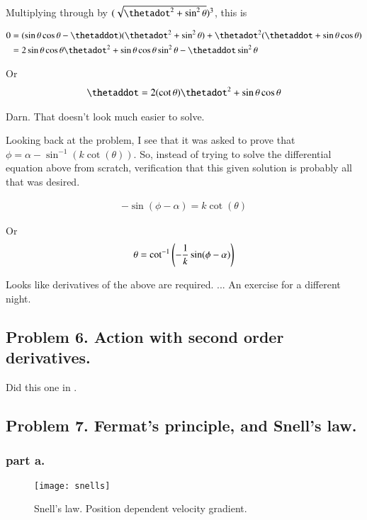 \documentclass{article}
\begin{document}
Multiplying through by $(\sqrt{\thetadot^2 + \sin^2\theta })^3$, this is

\begin{align*}
0 
&= (\sin\theta \cos\theta - \thetaddot) ( \thetadot^2 + \sin^2\theta ) + \thetadot^2( \thetaddot + \sin\theta\cos\theta )  \\
&= 
2 \sin\theta \cos\theta \thetadot^2 
+ \sin\theta \cos\theta \sin^2\theta 
- \thetaddot \sin^2\theta  
\\
\end{align*}

Or
\begin{align*}
\thetaddot =
2 (\cot\theta) \thetadot^2 
+ \sin\theta \cos\theta 
\end{align*}

Darn.  That doesn't look much easier to solve.

Looking back at the problem, I see that it was asked to prove that $\phi = \alpha - \sin^{-1}(k\cot(\theta))$.  So, instead of trying to solve
the differential equation above from scratch, verification that this given solution is probably all that was desired.

\begin{align*}
-\sin(\phi - \alpha) = k\cot(\theta)
\end{align*}

Or
\begin{align*}
\theta = \cot^{-1}\left(-\frac{1}{k} \sin(\phi - \alpha)\right)
\end{align*}

Looks like derivatives of the above are required. ... An exercise for a different night.

\subsection{ Problem 6.  Action with second order derivatives. }

Did this one in \cite{PJgoldch1}.

\subsection{ Problem 7.  Fermat's principle, and Snell's law. }

\subsubsection{ part a. }

\begin{figure}[htp]
\centering
\texttt{[image: snells]}
\caption{Snell's law.  Position dependent velocity gradient.}\label{fig:snells}
\end{figure}
\end{document}
